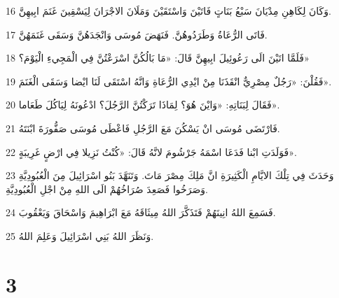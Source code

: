 \par 16 وَكَانَ لِكَاهِنِ مِدْيَانَ سَبْعُ بَنَاتٍ فَاتَيْنَ وَاسْتَقَيْنَ وَمَلَانَ الاجْرَانَ لِيَسْقِينَ غَنَمَ ابِيهِنَّ.
\par 17 فَاتَى الرُّعَاةُ وَطَرَدُوهُنَّ. فَنَهَضَ مُوسَى وَانْجَدَهُنَّ وَسَقَى غَنَمَهُنَّ.
\par 18 فَلَمَّا اتَيْنَ الَى رَعُوئِيلَ ابِيهِنَّ قَالَ: «مَا بَالُكُنَّ اسْرَعْتُنَّ فِي الْمَجِيءِ الْيَوْمَ؟»
\par 19 فَقُلْنَ: «رَجُلٌ مِصْرِيٌّ انْقَذَنَا مِنْ ايْدِي الرُّعَاةِ وَانَّهُ اسْتَقَى لَنَا ايْضا وَسَقَى الْغَنَمَ».
\par 20 فَقَالَ لِبَنَاتِهِ: «وَايْنَ هُوَ؟ لِمَاذَا تَرَكْتُنَّ الرَّجُلَ؟ ادْعُونَهُ لِيَاكُلَ طَعَاما».
\par 21 فَارْتَضَى مُوسَى انْ يَسْكُنَ مَعَ الرَّجُلِ فَاعْطَى مُوسَى صَفُّورَةَ ابْنَتَهُ.
\par 22 فَوَلَدَتِ ابْنا فَدَعَا اسْمَهُ جَرْشُومَ لانَّهُ قَالَ: «كُنْتُ نَزِيلا فِي ارْضٍ غَرِيبَةٍ».
\par 23 وَحَدَثَ فِي تِلْكَ الايَّامِ الْكَثِيرَةِ انَّ مَلِكَ مِصْرَ مَاتَ. وَتَنَهَّدَ بَنُو اسْرَائِيلَ مِنَ الْعُبُودِيَّةِ وَصَرَخُوا فَصَعِدَ صُرَاخُهُمْ الَى اللهِ مِنْ اجْلِ الْعُبُودِيَّةِ.
\par 24 فَسَمِعَ اللهُ انِينَهُمْ فَتَذَكَّرَ اللهُ مِيثَاقَهُ مَعَ ابْرَاهِيمَ وَاسْحَاقَ وَيَعْقُوبَ.
\par 25 وَنَظَرَ اللهُ بَنِي اسْرَائِيلَ وَعَلِمَ اللهُ.

\chapter{3}

